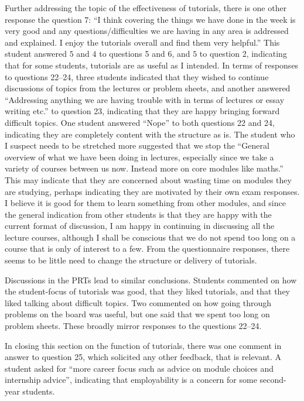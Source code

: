 Further addressing the topic of the effectiveness of tutorials, there is one other response the question 7: ``I think covering the things we have done in the week is very good and any questions/difficulties we are having in any area is addressed and explained. I enjoy the tutorials overall and find them very helpful.'' This student answered $5$ and $4$ to questions 5 and 6, and $5$ to question 2, indicating that for some students, tutorials are as useful as I intended. In terms of responses to questions 22--24, three students indicated that they wished to continue discussions of topics from the lectures or problem sheets, and another answered ``Addressing anything we are having trouble with in terms of lectures or essay writing etc.'' to question 23, indicating that they are happy bringing forward difficult topics. One student answered ``Nope'' to both questions 22 and 24, indicating they are completely content with the structure as is. The student who I suspect needs to be stretched more suggested that we stop the ``General overview of what we have been doing in lectures, especially since we take a variety of courses between us now. Instead more on core modules like maths.'' This may indicate that they are concerned about wasting time on modules they are studying, perhaps indicating they are motivated by their own exam responses. I believe it is good for them to learn something from other modules, and since the general indication from other students is that they are happy with the current format of discussion, I am happy in continuing in discussing all the lecture courses, although I shall be conscious that we do not spend too long on a course that is only of interest to a few. From the questionnaire responses, there seems to be little need to change the structure or delivery of tutorials.

Discussions in the PRTs lead to similar conclusions. Students commented on how the student-focus of tutorials was good, that they liked tutorials, and that they liked talking about difficult topics. Two commented on how going through problems on the board was useful, but one said that we spent too long on problem sheets. These broadly mirror responses to the questions 22--24.

In closing this section on the function of tutorials, there was one comment in answer to question 25, which solicited any other feedback, that is relevant. A student asked for ``more career focus such as advice on module choices and internship advice'', indicating that employability is a concern for some second-year students.

